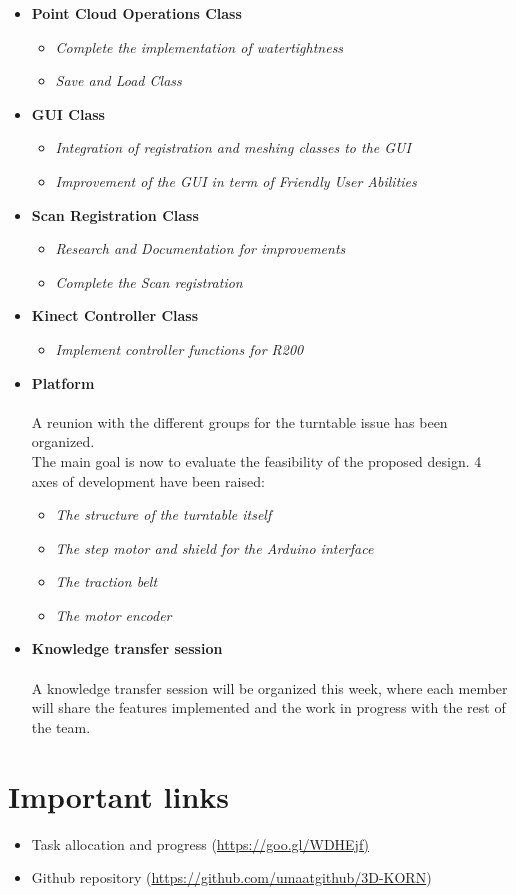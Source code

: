 \documentclass[11pt]{article} %
\begin{document}
\begin{itemize}

\item \textbf{Point Cloud Operations Class}
\begin{itemize}
\item \textit{Complete the implementation of watertightness}
\item \textit{Save and Load Class}
\end{itemize}

\item \textbf{GUI Class}
\begin{itemize}
\item \textit{Integration of registration and meshing classes to the GUI}
\item \textit{Improvement of the GUI in term of Friendly User Abilities}
\end{itemize}

\item \textbf{Scan Registration Class}
\begin{itemize}
\item \textit{Research and Documentation for improvements}
\item \textit{Complete the Scan registration}
\end{itemize}

\item \textbf{Kinect Controller Class}
\begin{itemize}
\item \textit{Implement controller functions for R200}
\end{itemize}

\item \textbf{Platform}\\
\\
A reunion with the different groups for the turntable issue has been organized.\\
The main goal is now to evaluate the feasibility of the proposed design. 4 axes of development have been raised:
\begin{itemize}
\item \textit{The structure of the turntable itself}
\item \textit{The step motor and shield for the Arduino interface}
\item \textit{The traction belt}
\item \textit{The motor encoder}
\end{itemize}

\item \textbf{Knowledge transfer session}\\
\\
A knowledge transfer session will be organized this week, where each member will share the features implemented and the work in progress with the rest of the team.
\end{itemize}

\section{Important links}
\begin{itemize}
\item Task allocation and progress  (\url{https://goo.gl/WDHEjf)}
\item Github repository (\url{https://github.com/umaatgithub/3D-KORN})
\end{itemize}
\end{document}
